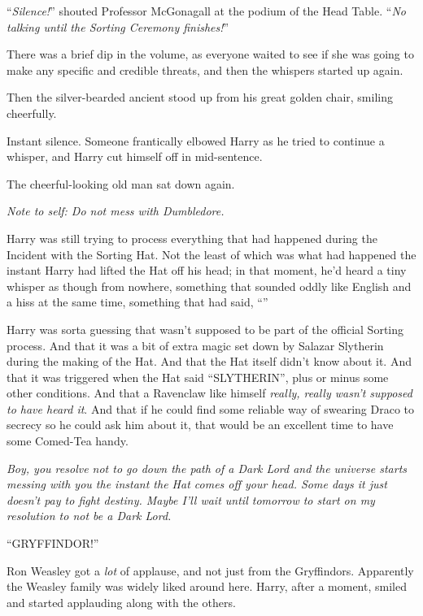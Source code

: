 “\emph{Silence!}” shouted Professor McGonagall at the podium of the Head Table. “\emph{No talking until the Sorting Ceremony finishes!}”

There was a brief dip in the volume, as everyone waited to see if she was going to make any specific and credible threats, and then the whispers started up again.

Then the silver-bearded ancient stood up from his great golden chair, smiling cheerfully.

Instant silence. Someone frantically elbowed Harry as he tried to continue a whisper, and Harry cut himself off in mid-sentence.

The cheerful-looking old man sat down again.

\emph{Note to self: Do not mess with Dumbledore.}

Harry was still trying to process everything that had happened during the Incident with the Sorting Hat. Not the least of which was what had happened the instant Harry had lifted the Hat off his head; in that moment, he’d heard a tiny whisper as though from nowhere, something that sounded oddly like English and a hiss at the same time, something that had said, “”

Harry was sorta guessing that wasn’t supposed to be part of the official Sorting process. And that it was a bit of extra magic set down by Salazar Slytherin during the making of the Hat. And that the Hat itself didn’t know about it. And that it was triggered when the Hat said “SLYTHERIN”, plus or minus some other conditions. And that a Ravenclaw like himself \emph{really, really wasn’t supposed to have heard it}. And that if he could find some reliable way of swearing Draco to secrecy so he could ask him about it, that would be an excellent time to have some Comed-Tea handy.

\emph{Boy, you resolve not to go down the path of a Dark Lord and the universe starts messing with you the instant the Hat comes off your head. Some days it just doesn’t pay to fight destiny. Maybe I’ll wait until tomorrow to start on my resolution to not be a Dark Lord.}

“GRYFFINDOR!”

Ron Weasley got a \emph{lot} of applause, and not just from the Gryffindors. Apparently the Weasley family was widely liked around here. Harry, after a moment, smiled and started applauding along with the others.

